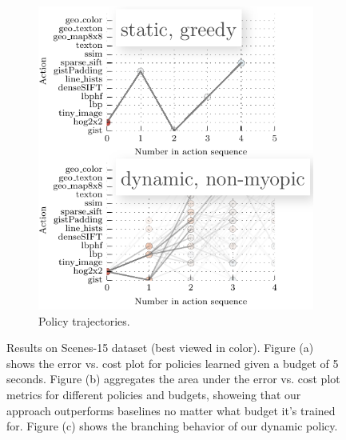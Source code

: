 \begin{figure}[ht]
\begin{subfigure}[b]{0.25\textwidth}
            \includegraphics[width=\textwidth]{../../figures/apr11_assembly/scenes_result.pdf}
            \caption{Policy trajectories.}
    \end{subfigure}

    \caption{
Results on Scenes-15 dataset (best viewed in color).
Figure (a) shows the error vs. cost plot for policies learned given a budget of 5 seconds.
Figure (b) aggregates the area under the error vs. cost plot metrics for different policies and budgets, showeing that our approach outperforms baselines no matter what budget it's trained for.
Figure (c) shows the branching behavior of our dynamic policy.
\label{fig:scenes}
    }
\end{figure}
